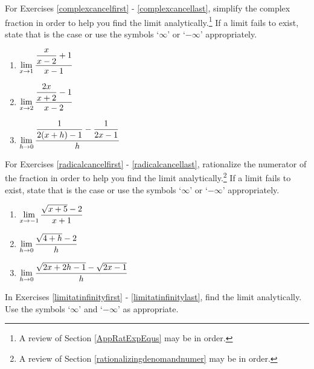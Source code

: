\documentclass{ximera}
\begin{document}
For Exercises \ref{complexcancelfirst} - \ref{complexcancellast}, simplify the complex fraction in order to help you find the limit analytically.\footnote{A review of Section \ref{AppRatExpEqus} may be in order.}  If a limit fails to exist, state that is the case  or use the symbols `$\infty$' or `$-\infty$' appropriately.

\begin{multicols}{3}
\begin{enumerate}
\setcounter{enumi}{\value{HW}}

\item\label{complexcancelfirst}  $\ds{\lim_{x \rightarrow 1} \dfrac{\dfrac{x}{x-2} +1}{x-1}}$

\item $\ds{ \lim_{x \rightarrow 2} \dfrac{\dfrac{2x}{x+2}  -1}{x-2} }$ 
     
\item\label{complexcancellast} $\ds{ \lim_{h \rightarrow 0} \dfrac{\dfrac{1}{2(x+h) - 1}  - \dfrac{1}{2x-1} }{h} }$ 

\setcounter{HW}{\value{enumi}}
\end{enumerate}
\end{multicols}

For Exercises \ref{radicalcancelfirst} - \ref{radicalcancellast}, rationalize the numerator of the fraction in order to help you find the limit analytically.\footnote{A review of Section \ref{rationalizingdenomandnumer} may be in order.} If a limit fails to exist, state that is the case  or use the symbols `$\infty$' or `$-\infty$' appropriately.


\begin{multicols}{3}
\begin{enumerate}
\setcounter{enumi}{\value{HW}}

 \item\label{radicalcancelfirst}  $\ds{ \lim_{x \rightarrow -1} \dfrac{\sqrt{x+5} - 2 }{x+1} }$  
   
 \item   $\ds{\lim_{h \rightarrow 0} \dfrac{\sqrt{4+h} - 2}{h}}$

\item\label{radicalcancellast} $\ds{ \lim_{h \rightarrow 0} \dfrac{\sqrt{2x+2h-1} - \sqrt{2x-1} }{h} }$  

\setcounter{HW}{\value{enumi}}
\end{enumerate}
\end{multicols}


 In Exercises \ref{limitatinfinityfirst} - \ref{limitatinfinitylast},  find the limit analytically.  Use the symbols `$\infty$' and `$-\infty$' as appropriate.
\end{document}
